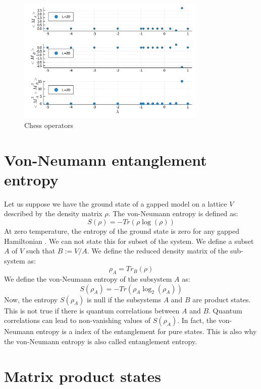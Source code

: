 \documentclass[12pt, a4paper, twoside, titlepage]{article}
\begin{document}
\begin{figure}[htp!]
  \centering
  \includegraphics[width=0.8\textwidth]{images/chessop.pdf}
  \caption{Chess operators}
  \label{}
\end{figure}


\section{Von-Neumann entanglement entropy}

Let us suppose we have the ground state of a gapped model on a lattice $V$ described by the density matrix $\rho$. The von-Neumann entropy is defined as:
\begin{equation}
S(\rho)=-Tr(\rho\log(\rho))
\end{equation}
At zero temperature, the entropy of the ground state is zero for any gapped Hamiltonian \cite{Eisert_2010}. We can not state this for subset of the system.
We define a subset $A$ of $V$ such that $B:=V / A $. We define the reduced density matrix of the sub-system as:
\begin{equation} \label{eq:Apartition}
\rho_A=Tr_B(\rho)
\end{equation}
We define the von-Neumann entropy of the subsystem $A$ as:
\begin{equation}
S(\rho_A)=-Tr(\rho_A\log_2(\rho_A))
\end{equation}
Now, the entropy $S(\rho_A)$ is null if the subsystems $A$ and $B$ are product states. This is not true if there is quantum correlations between $A$ and $B$. Quantum correlations can lead to non-vanishing values of $S(\rho_A)$. In fact, the von-Neumann entropy is a index of the entanglement for pure states. This is also why the von-Neumann entropy is also called entanglement entropy.



\section{Matrix product states}
\end{document}
